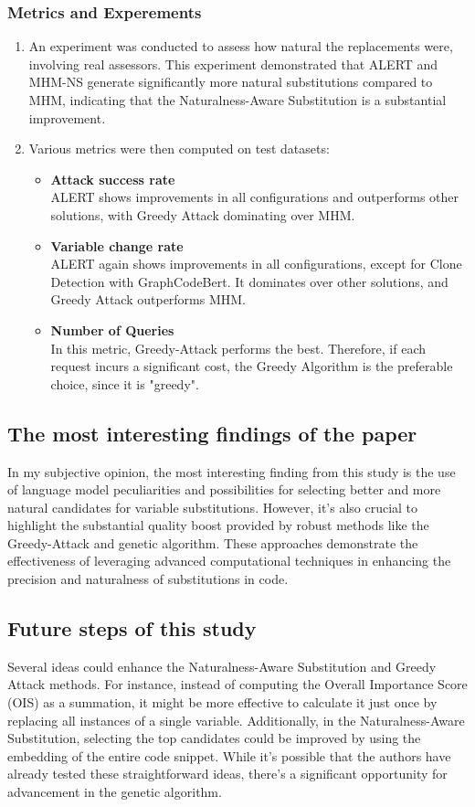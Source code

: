 \documentclass[12pt,letterpaper]{article}
\begin{document}
\subsubsection*{Metrics and Experements}
\begin{enumerate}
\item An experiment was conducted to assess how natural the replacements were, involving real assessors. This experiment demonstrated that ALERT and MHM-NS generate significantly more natural substitutions compared to MHM, indicating that the Naturalness-Aware Substitution is a substantial improvement.
\item Various metrics were then computed on test datasets:
\begin{itemize}
\item \textbf{Attack success rate}  
\\ ALERT shows improvements in all configurations and outperforms other solutions, with Greedy Attack dominating over MHM.
\item \textbf{Variable change rate}
\\ ALERT again shows improvements in all configurations, except for Clone Detection with GraphCodeBert. It dominates over other solutions, and Greedy Attack outperforms MHM.
\item \textbf{Number of Queries}
\\ In this metric, Greedy-Attack performs the best. Therefore, if each request incurs a significant cost, the Greedy Algorithm is the preferable choice, since it is "greedy".
\end{itemize}
\end{enumerate}

\subsection*{The most interesting findings of the paper}
In my subjective opinion, the most interesting finding from this study is the use of language model peculiarities and possibilities for selecting better and more natural candidates for variable substitutions. However, it's also crucial to highlight the substantial quality boost provided by robust methods like the Greedy-Attack and genetic algorithm. These approaches demonstrate the effectiveness of leveraging advanced computational techniques in enhancing the precision and naturalness of substitutions in code.

\subsection*{Future steps of this study}
Several ideas could enhance the Naturalness-Aware Substitution and Greedy Attack methods. For instance, instead of computing the Overall Importance Score (OIS) as a summation, it might be more effective to calculate it just once by replacing all instances of a single variable. Additionally, in the Naturalness-Aware Substitution, selecting the top candidates could be improved by using the embedding of the entire code snippet. While it's possible that the authors have already tested these straightforward ideas, there's a significant opportunity for advancement in the genetic algorithm.
\end{document}
